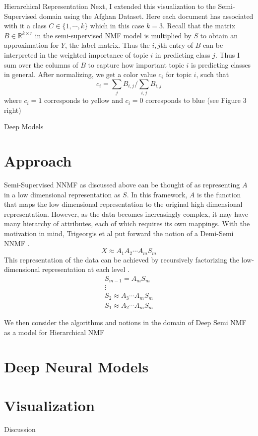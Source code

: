 \documentclass[12pt]{pom_thesis}
\begin{document}
\begin{chapter}{Hierarchical Representation}
Next, I extended this visualization to the Semi-Supervised domain using the Afghan Dataset. Here each document has associated with it a class $C\in \{1,\cdots,k\}$ which in this case $k=3$. Recall that the matrix $B \in \mathbb{R}^{k \times r}$ in the semi-supervised NMF model is multiplied by $S$ to obtain an approximation for $Y$, the label matrix. Thus the $i,j$th entry of $B$ can be interpreted in the weighted importance of topic $i$ in predicting class $j$. Thus I sum over the columns of $B$ to capture how important topic $i$ is predicting classes in general. After normalizing, we get a color value $c_i$ for topic $i$, such that
$$c_i = \sum_j B_{i,j} /  \sum_{i,j} B_{i,j}$$
where $c_i=1$ corresponds to yellow and $c_i=0$ corresponds to blue (see Figure 3 right)
\end{chapter}

\begin{chapter}{Deep Models}
\section{Approach}
Semi-Supervised NNMF as discussed above can be thought of as representing $A$ in a low dimensional representation as $S$. In this framework, $A$ is the function that maps the low dimensional representation to the original high dimensional representation. However, as the data becomes increasingly complex, it may have many hierarchy of attributes, each of which requires its own mappings. With the motivation in mind, Trigeorgis et al put forward the notion of a Demi-Semi NNMF \cite{trigeorgis2014deep}.
$$X \approx A_1A_2 \cdots A_m S_m$$
This representation of the data can be achieved by recursively factorizing the low-dimensional representation at each level \cite{trigeorgis2014deep}.
\begin{align*}
S_{m-1} = A_mS_m\\
\vdots \\
S_2  \approx A_3 \cdots A_m  S_m\\
S_1  \approx A_2 \cdots A_m  S_m
\end{align*}

We then consider the algorithms and notions in the domain of Deep Semi NMF as a model for Hierarchical NMF \cite{ deepNonNeg, trigeorgis2014deep} 
\section{Deep Neural Models}
\section{Visualization}
	\end{chapter}
\begin{chapter}{Discussion}
	\end{chapter}





\end{document}
